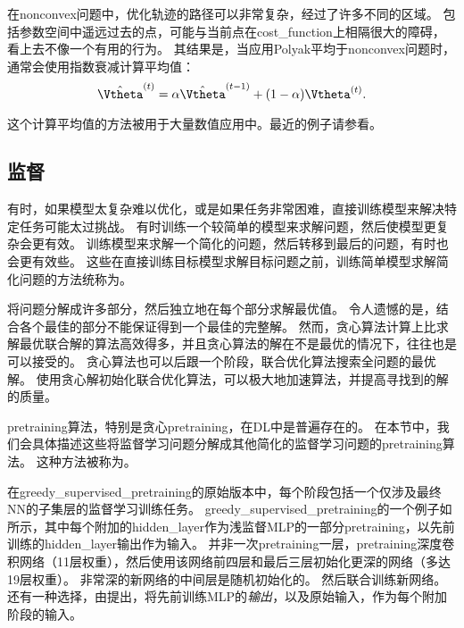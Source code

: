 
在\gls{nonconvex}问题中，优化轨迹的路径可以非常复杂，经过了许多不同的区域。
包括参数空间中遥远过去的点，可能与当前点在\gls{cost_function}上相隔很大的障碍，看上去不像一个有用的行为。
其结果是，当应用Polyak平均于\gls{nonconvex}问题时，通常会使用指数衰减计算平均值：
\begin{equation}
    \hat{\Vtheta}^{(t)} = \alpha \hat{\Vtheta}^{(t-1)} + (1-\alpha) \Vtheta^{(t)} .
\end{equation}

这个计算平均值的方法被用于大量数值应用中。最近的例子请参看\cite{Szegedy-et-al-2015}。

\subsection{监督}
\label{sec:supervised_pretraining}
有时，如果模型太复杂难以优化，或是如果任务非常困难，直接训练模型来解决特定任务可能太过挑战。
有时训练一个较简单的模型来求解问题，然后使模型更复杂会更有效。
训练模型来求解一个简化的问题，然后转移到最后的问题，有时也会更有效些。
这些在直接训练目标模型求解目标问题之前，训练简单模型求解简化问题的方法统称为。


将问题分解成许多部分，然后独立地在每个部分求解最优值。
令人遗憾的是，结合各个最佳的部分不能保证得到一个最佳的完整解。
然而，贪心算法计算上比求解最优联合解的算法高效得多，并且贪心算法的解在不是最优的情况下，往往也是可以接受的。
贪心算法也可以后跟一个阶段，联合优化算法搜索全问题的最优解。
使用贪心解初始化联合优化算法，可以极大地加速算法，并提高寻找到的解的质量。

\gls{pretraining}算法，特别是贪心\gls{pretraining}，在\gls{DL}中是普遍存在的。
在本节中，我们会具体描述这些将监督学习问题分解成其他简化的监督学习问题的\gls{pretraining}算法。
这种方法被称为。


在\gls{greedy_supervised_pretraining}的原始版本\citep{Bengio-nips-2006-short}中，每个阶段包括一个仅涉及最终\gls{NN}的子集层的监督学习训练任务。
\gls{greedy_supervised_pretraining}的一个例子如所示，其中每个附加的\gls{hidden_layer}作为浅监督MLP的一部分\gls{pretraining}，以先前训练的\gls{hidden_layer}输出作为输入。
并非一次\gls{pretraining}一层，\cite{Simonyan2015}\gls{pretraining}深度卷积网络（11层权重），然后使用该网络前四层和最后三层初始化更深的网络（多达19层权重）。
非常深的新网络的中间层是随机初始化的。
然后联合训练新网络。
还有一种选择，由\cite{Yu+al-2010}提出，将先前训练MLP的\emph{输出}，以及原始输入，作为每个附加阶段的输入。

